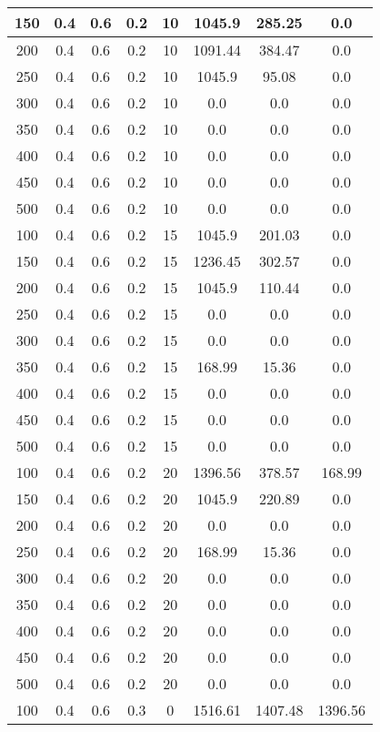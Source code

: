 \documentclass[a4paper, 12pt]{extreport}
\begin{document}
\begin{itemize}
\begin{longtable}{|c|c|c|c|c|c|c|c|}
			150 & 0.4 & 0.6 & 0.2 & 10 & 1045.9 & 285.25 & 0.0 \\\hline
			200 & 0.4 & 0.6 & 0.2 & 10 & 1091.44 & 384.47 & 0.0 \\\hline
			250 & 0.4 & 0.6 & 0.2 & 10 & 1045.9 & 95.08 & 0.0 \\\hline
			300 & 0.4 & 0.6 & 0.2 & 10 & 0.0 & 0.0 & 0.0 \\\hline
			350 & 0.4 & 0.6 & 0.2 & 10 & 0.0 & 0.0 & 0.0 \\\hline
			400 & 0.4 & 0.6 & 0.2 & 10 & 0.0 & 0.0 & 0.0 \\\hline
			450 & 0.4 & 0.6 & 0.2 & 10 & 0.0 & 0.0 & 0.0 \\\hline
			500 & 0.4 & 0.6 & 0.2 & 10 & 0.0 & 0.0 & 0.0 \\\hline
			100 & 0.4 & 0.6 & 0.2 & 15 & 1045.9 & 201.03 & 0.0 \\\hline
			150 & 0.4 & 0.6 & 0.2 & 15 & 1236.45 & 302.57 & 0.0 \\\hline
			200 & 0.4 & 0.6 & 0.2 & 15 & 1045.9 & 110.44 & 0.0 \\\hline
			250 & 0.4 & 0.6 & 0.2 & 15 & 0.0 & 0.0 & 0.0 \\\hline
			300 & 0.4 & 0.6 & 0.2 & 15 & 0.0 & 0.0 & 0.0 \\\hline
			350 & 0.4 & 0.6 & 0.2 & 15 & 168.99 & 15.36 & 0.0 \\\hline
			400 & 0.4 & 0.6 & 0.2 & 15 & 0.0 & 0.0 & 0.0 \\\hline
			450 & 0.4 & 0.6 & 0.2 & 15 & 0.0 & 0.0 & 0.0 \\\hline
			500 & 0.4 & 0.6 & 0.2 & 15 & 0.0 & 0.0 & 0.0 \\\hline
			100 & 0.4 & 0.6 & 0.2 & 20 & 1396.56 & 378.57 & 168.99 \\\hline
			150 & 0.4 & 0.6 & 0.2 & 20 & 1045.9 & 220.89 & 0.0 \\\hline
			200 & 0.4 & 0.6 & 0.2 & 20 & 0.0 & 0.0 & 0.0 \\\hline
			250 & 0.4 & 0.6 & 0.2 & 20 & 168.99 & 15.36 & 0.0 \\\hline
			300 & 0.4 & 0.6 & 0.2 & 20 & 0.0 & 0.0 & 0.0 \\\hline
			350 & 0.4 & 0.6 & 0.2 & 20 & 0.0 & 0.0 & 0.0 \\\hline
			400 & 0.4 & 0.6 & 0.2 & 20 & 0.0 & 0.0 & 0.0 \\\hline
			450 & 0.4 & 0.6 & 0.2 & 20 & 0.0 & 0.0 & 0.0 \\\hline
			500 & 0.4 & 0.6 & 0.2 & 20 & 0.0 & 0.0 & 0.0 \\\hline
			100 & 0.4 & 0.6 & 0.3 & 0 & 1516.61 & 1407.48 & 1396.56 \\\hline

\end{longtable}
\end{itemize}
\end{document}
